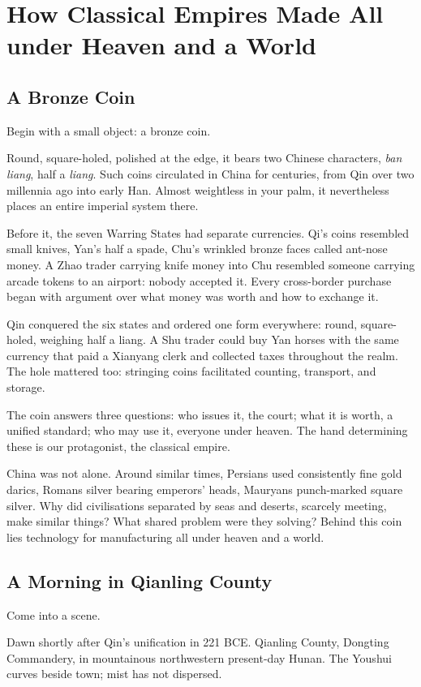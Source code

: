 \chapter[How Empires Made a World]{How Classical Empires Made All under Heaven and a World}
\section{A Bronze Coin}
Begin with a small object: a bronze coin.

Round, square-holed, polished at the edge, it bears two Chinese characters, \textit{ban liang}, half a \textit{liang}. Such coins circulated in China for centuries, from Qin over two millennia ago into early Han. Almost weightless in your palm, it nevertheless places an entire imperial system there.

Before it, the seven Warring States had separate currencies. Qi's coins resembled small knives, Yan's half a spade, Chu's wrinkled bronze faces called ant-nose money. A Zhao trader carrying knife money into Chu resembled someone carrying arcade tokens to an airport: nobody accepted it. Every cross-border purchase began with argument over what money was worth and how to exchange it.

Qin conquered the six states and ordered one form everywhere: round, square-holed, weighing half a liang. A Shu trader could buy Yan horses with the same currency that paid a Xianyang clerk and collected taxes throughout the realm. The hole mattered too: stringing coins facilitated counting, transport, and storage.

The coin answers three questions: who issues it, the court; what it is worth, a unified standard; who may use it, everyone under heaven. The hand determining these is our protagonist, the classical empire.

China was not alone. Around similar times, Persians used consistently fine gold darics, Romans silver bearing emperors' heads, Mauryans punch-marked square silver. Why did civilisations separated by seas and deserts, scarcely meeting, make similar things? What shared problem were they solving? Behind this coin lies technology for manufacturing all under heaven and a world.

\section{A Morning in Qianling County}
Come into a scene.

Dawn shortly after Qin's unification in 221 BCE. Qianling County, Dongting Commandery, in mountainous northwestern present-day Hunan. The Youshui curves beside town; mist has not dispersed.

